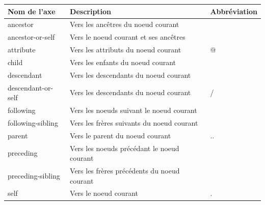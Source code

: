 \centering
\begin{table}[H]
\begin{tabular}{l|l|l}
\textbf{Nom de l'axe} & \textbf{Description}                       & \textbf{Abbréviation} \\ \hline
ancestor              & Vers les ancêtres du noeud courant         &                       \\ \hline
ancestor-or-self      & Vers le noeud courant et ses ancêtres       &                       \\ \hline
attribute             & Vers les attributs du noeud courant        & @                     \\ \hline
child                 & Vers les enfants du noeud courant           &                       \\ \hline
descendant            & Vers les descendants du noeud courant       &                       \\ \hline
descendant-or-self    & Vers les descendants du noeud courant       & /                     \\ \hline
following             & Vers les noeuds suivant le noeud courant     &                       \\ \hline
following-sibling     & Vers les frères suivants du noeud courant   &                       \\ \hline
parent                & Vers le parent du noeud courant             & ..                    \\ \hline
preceding             & Vers les noeuds précédant le noeud courant   &                       \\ \hline
preceding-sibling     & Vers les frères précédents du noeud courant &                       \\ \hline
self                  & Vers le noeud courant                       & .                    
\end{tabular}
\end{table}